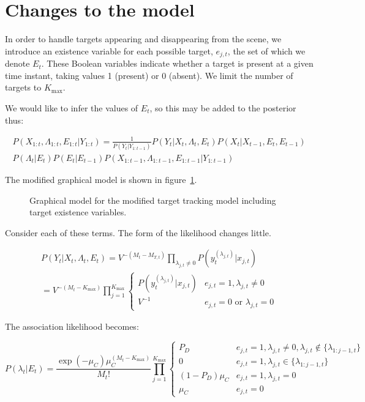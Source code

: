 \section{Changes to the model}
In order to handle targets appearing and disappearing from the scene, we introduce an existence variable for each possible target, $e_{j,t}$, the set of which we denote $E_t$. These Boolean variables indicate whether a target is present at a given time instant, taking values 1 (present) or 0 (absent). We limit the number of targets to $K_{\max}$.

We would like to infer the values of $E_t$, so this may be added to the posterior thus:

\begin{multline}
P(X_{1:t}, \Lambda_{1:t}, E_{1:t}|Y_{1:t}) = \frac{1}{P(Y_t|Y_{1:t-1})} P(Y_t|X_t, \Lambda_t, E_t) P(X_t|X_{t-1}, E_t, E_{t-1}) \\ P(\Lambda_t|E_t) P(E_t|E_{t-1}) P(X_{1:t-1}, \Lambda_{1:t-1}, E_{1:t-1}|Y_{1:t-1})
\label{eq:MTPosteriorWithE}
\end{multline}

The modified graphical model is shown in figure~\ref{fig:HMMExist}.

\begin{figure}[hbt]%

\caption{Graphical model for the modified target tracking model including target existence variables.}%
\label{fig:HMMExist}%
\end{figure}

Consider each of these terms. The form of the likelihood changes little.

\begin{multline}
P(Y_t|X_t, \Lambda_t, E_t) = V^{-(M_t-M_{T,t})} \prod_{\lambda_{j,t} \ne 0} P(y_t^{(\lambda_{j,t})}|x_{j,t}) \\
= V^{-(M_t-K_{\max})} \prod_{j=1}^{K_{\max}} \begin{cases} P(y_t^{(\lambda_{j,t})}|x_{j,t}) & e_{j,t} = 1, \lambda_{j,t} \ne 0 \\ V^{-1} & e_{j,t} = 0 \text{ or } \lambda_{j,t} = 0 \end{cases}
\label{eq:MTLikelihood}
\end{multline}

The association likelihood becomes:

\begin{equation}
P(\lambda_t|E_t) = \frac{\exp(-\mu_C) \mu_C^{(M_t-K_{\max})}}{M_t!} \prod_{j=1}^{K_{\max}} \begin{cases} P_D & e_{j,t} = 1, \lambda_{j,t} \ne 0, \lambda_{j,t} \notin \{ \lambda_{1:j-1,t} \} \\ 0 & e_{j,t} = 1, \lambda_{j,t} \in \{ \lambda_{1:j-1,t} \} \\ (1-P_D) \mu_C & e_{j,t} = 1, \lambda_{j,t}=0 \\ \mu_C & e_{j,t} = 0 \end{cases}
\label{eq:MTFactorisedAssociationLikelihoodWithE}
\end{equation}

